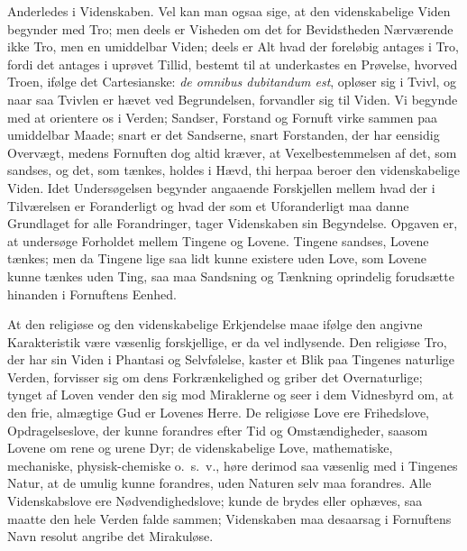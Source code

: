 \documentclass[12pt,a4paper]{article}
\begin{document}
Anderledes i Videnskaben. Vel kan man ogsaa sige, at den videnskabelige
Viden begynder med Tro; men deels er Visheden om det for Bevidstheden
Nærværende ikke Tro, men en umiddelbar Viden; deels er Alt hvad der
foreløbig antages i Tro, fordi det antages i uprøvet Tillid, bestemt
til at underkastes en Prøvelse, hvorved Troen, ifølge det Cartesianske:
\emph{de omnibus dubitandum est}, opløser sig i Tvivl, og naar saa
Tvivlen er hævet ved Begrundelsen, forvandler sig til Viden. Vi begynde
med at orientere os i Verden; Sandser, Forstand og Fornuft virke
sammen paa umiddelbar Maade; snart er det Sandserne, snart Forstanden,
der har eensidig Overvægt, medens Fornuften dog altid kræver, at
Vexelbestemmelsen af det, som sandses, og det, som tænkes, holdes i
Hævd, thi herpaa beroer den videnskabelige Viden. Idet Undersøgelsen
begynder angaaende Forskjellen mellem hvad der i Tilværelsen er
Foranderligt og hvad der som et Uforanderligt maa danne Grundlaget for
alle Forandringer, tager Videnskaben sin Begyndelse. Opgaven er, at
undersøge Forholdet mellem Tingene og Lovene. Tingene sandses, Lovene
tænkes; men da Tingene lige saa lidt kunne existere uden Love, som
Lovene kunne tænkes uden Ting, saa maa Sandsning og Tænkning oprindelig
forudsætte hinanden i Fornuftens Eenhed.

At den religiøse og den videnskabelige Erkjendelse maae ifølge den
angivne Karakteristik være væsenlig forskjellige, er da vel indlysende.
Den religiøse Tro, der har sin Viden i Phantasi og Selvfølelse, kaster
et Blik paa Tingenes naturlige Verden, forvisser sig om dens
Forkrænkelighed og griber det Overnaturlige; tynget af Loven vender
den sig mod Miraklerne og seer i dem Vidnesbyrd om, at den frie,
almægtige Gud er Lovenes Herre. De religiøse Love ere Frihedslove,
Opdragelseslove, der kunne forandres efter Tid og Omstændigheder,
saasom Lovene om rene og urene Dyr; de videnskabelige Love,
mathematiske, mechaniske, physisk-chemiske o.\ s.\ v., høre derimod
saa væsenlig med i Tingenes Natur, at de umulig kunne forandres, uden
Naturen selv maa forandres. Alle Videnskabslove ere Nødvendighedslove;
kunde de brydes eller ophæves, saa maatte den hele Verden falde sammen;
Videnskaben maa desaarsag i Fornuftens Navn resolut angribe det
Mirakuløse.
\end{document}
